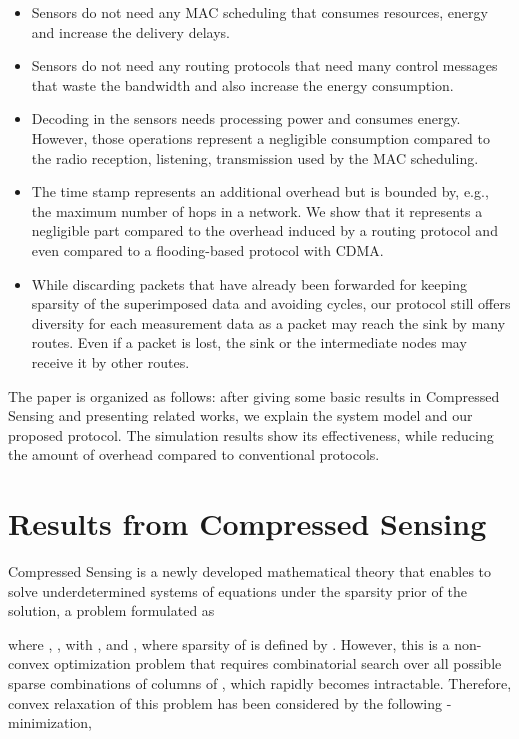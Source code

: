 \documentclass[letterpaper,conference]{IEEEtran}
\begin{document}
\begin{itemize}
\item Sensors do not need any MAC scheduling that consumes resources, energy and increase the delivery delays.
\item Sensors do not need any routing protocols that need many control messages that waste the bandwidth and also increase the energy consumption.
\item Decoding in the sensors needs processing power and consumes energy. However, those operations represent a negligible consumption compared to the radio reception, listening, transmission used by the MAC scheduling.
\item The time stamp represents an additional overhead but is bounded by, e.g., the maximum number of hops in a network. We show that it represents a negligible part compared to the overhead induced by a routing protocol and even compared to a flooding-based protocol with CDMA.
\item While discarding packets that have already been forwarded for keeping sparsity of the superimposed data and avoiding cycles, our protocol still offers diversity for each measurement data as a packet may reach the sink by many routes. Even if a packet is lost, the sink or the intermediate nodes may receive it by other routes.
\end{itemize}

The paper is organized as follows: after giving some basic results in Compressed Sensing and presenting related works, we explain the system model and our proposed protocol. The simulation results show its effectiveness, while reducing the amount of overhead compared to conventional protocols.


\section{Results from Compressed Sensing}
\label{sec CS}

Compressed Sensing is a newly developed mathematical theory that enables to solve underdetermined systems of equations under the sparsity prior of the solution, a problem formulated as

where , ,  with , and , where sparsity of  is defined by .
However, this is a non-convex optimization problem that requires combinatorial search over all possible sparse combinations of columns of , which rapidly becomes intractable. Therefore, convex relaxation of this problem has been considered by the following -minimization,
\end{document}
